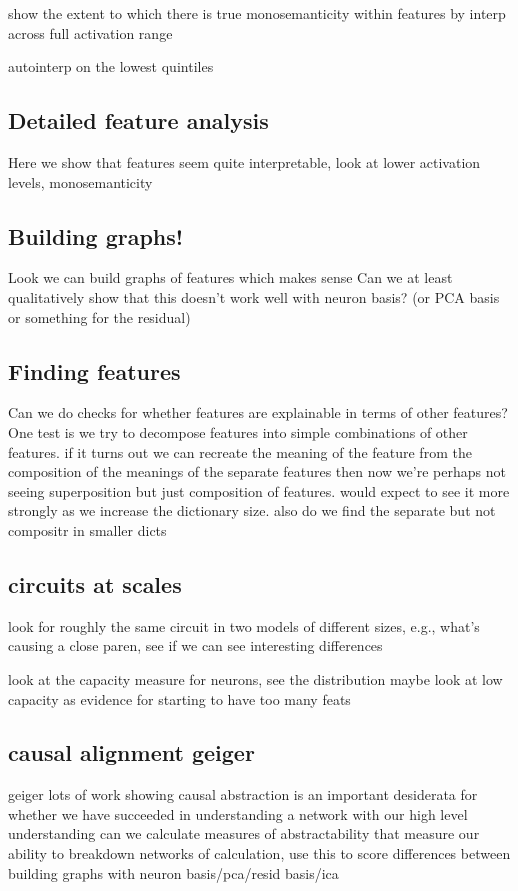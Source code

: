 show the extent to which there is true monosemanticity within features by interp across full activation range

autointerp on the lowest quintiles 


\subsection{Detailed feature analysis}
Here we show that features seem quite interpretable, look at lower activation levels, monosemanticity

\subsection{Building graphs!}
Look we can build graphs of features which makes sense
Can we at least qualitatively show that this doesn't work well with neuron basis?
(or PCA basis or something for the residual)


\subsection{Finding features}
Can we do checks for whether features are explainable in terms of other features?
One test is we try to decompose features into simple combinations of other features. if it turns out we can recreate the meaning of the feature from the composition of the meanings of the separate features then now we're perhaps not seeing superposition but just composition of features. would expect to see it more strongly as we increase the dictionary size. also do we find the separate but not compositr in smaller dicts

\subsection{circuits at scales}
look for roughly the same circuit in two models of different sizes, e.g., what's causing a close paren, see if we can see interesting differences

look at the capacity measure for neurons, see the distribution maybe look at low capacity as evidence for starting to have too many feats \citep{scherlis2023polysemanticity}

\subsection{causal alignment geiger}
geiger lots of work showing causal abstraction is an important desiderata for whether we have succeeded in understanding a network with our high level understanding\citep{geiger2023causal}
can we calculate measures of abstractability that measure our ability to breakdown networks of calculation, use this to score differences between building graphs with neuron basis/pca/resid basis/ica








